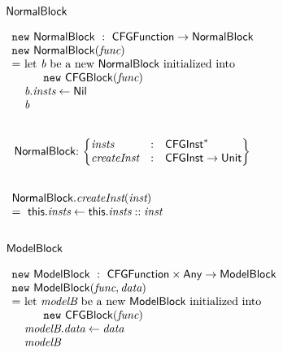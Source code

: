 \subsection{$\mbox{\textsf{NormalBlock}}$}
$
\begin{array}{l@{}l@{~}l}
\lefteqn{\new \ \NormalBlock \ : \ \CFGFunction \rightarrow \NormalBlock}\\
\lefteqn{\new\ \NormalBlock(\emph{func})}\\
& = & \text{let } \emph{b} \text{ be a new } \NormalBlock \text{ initialized into }\\
& & \quad\ \ \new\ \CFGBlock(\emph{func})\\
& & \emph{b}.\emph{insts} \leftarrow \Nil \\
& & \emph{b}\\
\end{array}
$

\noindent
$
\begin{array}{@{~}r@{~}l@{}l@{~}l}
\\
& \NormalBlock & : &
\begin{Bmatrix*}[l]
\emph{insts} & : & \CFGInst^{*} \\
\emph{createInst} & : & \CFGInst \rightarrow \Unit \\
\end{Bmatrix*}\\
\end{array}
$

\noindent
$
\begin{array}{l}
\\
\mbox{\textsf{NormalBlock}}.\emph{createInst}(\emph{inst})\\
= \ \mbox{\textsf{this}}.\emph{insts} \leftarrow \mbox{\textsf{this}}.\emph{insts} :: \emph{inst}\\
\end{array}
$

\subsection{$\mbox{\textsf{ModelBlock}}$}
$
\begin{array}{l@{}l@{~}l}
\lefteqn{\new \ \ModelBlock \ : \ \CFGFunction \times \Any \rightarrow \ModelBlock}\\
\lefteqn{\new\ \ModelBlock(\emph{func}, \emph{data})}\\
& = & \text{let } \emph{modelB} \text{ be a new } \ModelBlock \text{ initialized into }\\
& & \quad\ \ \new\ \CFGBlock(\emph{func})\\
& & \emph{modelB}.\emph{data} \leftarrow \emph{data} \\
& & \emph{modelB}\\
\end{array}
$

